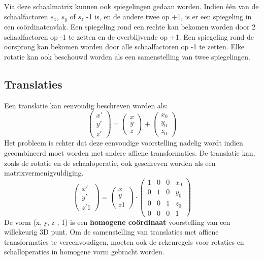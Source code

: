 \documentclass{report}
\begin{document}
	Via deze schaalmatrix kunnen ook spiegelingen gedaan worden. Indien één van de schaalfactoren $s_x$, $s_y$ of $s_z$ -1 is, en de andere twee op +1, is er een spiegeling in een coördinatenvlak. Een spiegeling rond een rechte kan bekomen worden door 2 schaalfactoren op -1 te zetten en de overblijvende op +1. Een spiegeling rond de oorsprong kan bekomen worden door alle schaalfactoren op -1 te zetten.
	Elke rotatie kan ook beschouwd worden als een samenstelling van twee spiegelingen.

	\subsection{Translaties}
	Een translatie kan eenvoudig beschreven worden als:
	$$
		\begin{pmatrix}
			x' \\
			y' \\
			z'
		\end{pmatrix}
		=
		\begin{pmatrix}
			x \\
			y \\ 
			z
		\end{pmatrix}
		+
		\begin{pmatrix}
			 x_0 \\
			 y_0 \\
			 z_0
		\end{pmatrix}
	$$
	Het probleem is echter dat deze eenvoudige voorstelling nadelig wordt indien gecombineerd moet worden met andere affiene transformaties. De translatie kan, zoals de rotatie en de schaaloperatie, ook geschreven worden als een matrixvermenigvuldiging.
	$$
\begin{pmatrix}
x' \\
y' \\
z'
1
\end{pmatrix}
=
\begin{pmatrix}
x \\
y \\ 
z
1
\end{pmatrix}
\cdot
\begin{pmatrix}
1 & 0 & 0 & x_0 \\
0 & 1 & 0 & y_0 \\
0 & 0 & 1 & z_0 \\
0 & 0 & 0 & 1
\end{pmatrix}
$$
De vorm (x, y, z , 1) is een \textbf{homogene coördinaat} voorstelling van een willekeurig 3D punt. Om de samenstelling van translaties met affiene transformaties te vereenvoudigen, moeten ook de rekenregels voor rotaties en schalloperaties in homogene vorm gebracht worden.  
\end{document}
